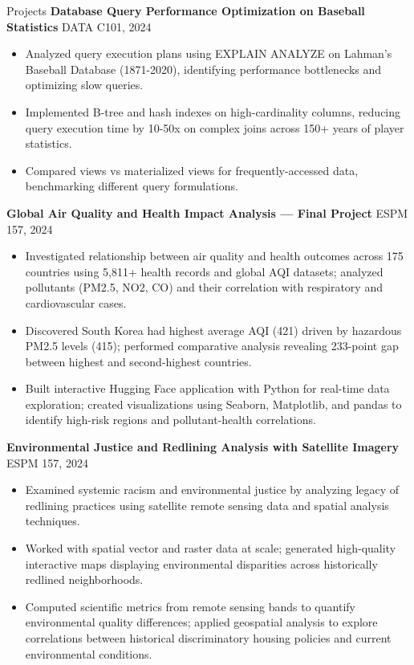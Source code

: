 \documentclass{resume}
\begin{document}
\begin{rSection}{Projects}
\textbf{Database Query Performance Optimization on Baseball Statistics} \hfill DATA C101, 2024
\begin{itemize}
  \item Analyzed query execution plans using EXPLAIN ANALYZE on Lahman's Baseball Database (1871-2020), identifying performance bottlenecks and optimizing slow queries.
  \item Implemented B-tree and hash indexes on high-cardinality columns, reducing query execution time by 10-50x on complex joins across 150+ years of player statistics.
  \item Compared views vs materialized views for frequently-accessed data, benchmarking different query formulations.
\end{itemize}

\textbf{Global Air Quality and Health Impact Analysis — Final Project} \hfill ESPM 157, 2024
\begin{itemize}
  \item Investigated relationship between air quality and health outcomes across 175 countries using 5,811+ health records and global AQI datasets; analyzed pollutants (PM2.5, NO2, CO) and their correlation with respiratory and cardiovascular cases.
  \item Discovered South Korea had highest average AQI (421) driven by hazardous PM2.5 levels (415); performed comparative analysis revealing 233-point gap between highest and second-highest countries.
  \item Built interactive Hugging Face application with Python for real-time data exploration; created visualizations using Seaborn, Matplotlib, and pandas to identify high-risk regions and pollutant-health correlations.
\end{itemize}

\textbf{Environmental Justice and Redlining Analysis with Satellite Imagery} \hfill ESPM 157, 2024
\begin{itemize}
  \item Examined systemic racism and environmental justice by analyzing legacy of redlining practices using satellite remote sensing data and spatial analysis techniques.
  \item Worked with spatial vector and raster data at scale; generated high-quality interactive maps displaying environmental disparities across historically redlined neighborhoods.
  \item Computed scientific metrics from remote sensing bands to quantify environmental quality differences; applied geospatial analysis to explore correlations between historical discriminatory housing policies and current environmental conditions.
\end{itemize}


\end{rSection}
\end{document}
